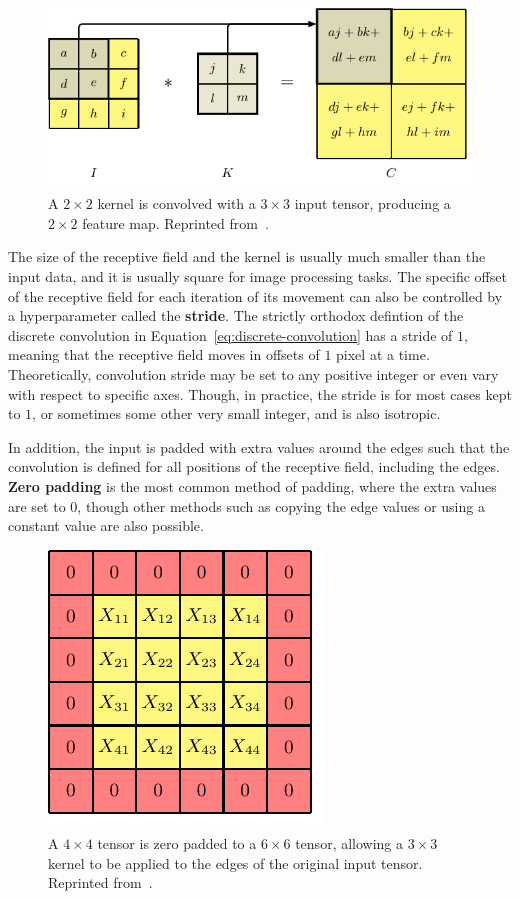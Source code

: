 \documentclass[12pt]{report}
\theoremstyle{definition}
\theoremstyle{remark}
\begin{document}
\begin{figure}[h]
    \centering
    \includegraphics[width=0.7\linewidth]{figs/2d_convolution.pdf}
    \caption{A $2 \times 2$ kernel is convolved with a $3 \times 3$ input tensor, producing a $2 \times 2$ feature map. Reprinted from~\cite{bishop_deep_2023}.}
    \label{fig:2d-convolution}
\end{figure}

The size of the receptive field and the kernel is usually much smaller than the input data, and it is usually square for image processing tasks. The specific offset of the receptive field for each iteration of its movement can also be controlled by a hyperparameter called the \textbf{stride}. The strictly orthodox defintion of the discrete convolution in Equation~\ref{eq:discrete-convolution} has a stride of $1$, meaning that the receptive field moves in offsets of $1$ pixel at a time. Theoretically, convolution stride may be set to any positive integer or even vary with respect to specific axes. Though, in practice, the stride is for most cases kept to $1$, or sometimes some other very small integer, and is also isotropic.

In addition, the input is padded with extra values around the edges such that the convolution is defined for all positions of the receptive field, including the edges. \textbf{Zero padding} is the most common method of padding, where the extra values are set to $0$, though other methods such as copying the edge values or using a constant value are also possible.

\begin{figure}[h]
    \centering
    \includegraphics[width=0.35\linewidth]{figs/padding.pdf}
    \caption{A $4 \times 4$ tensor is zero padded to a $6 \times 6$ tensor, allowing a $3 \times 3$ kernel to be applied to the edges of the original input tensor. Reprinted from~\cite{bishop_deep_2023}.}
    \label{fig:padding}
\end{figure}
\end{document}
